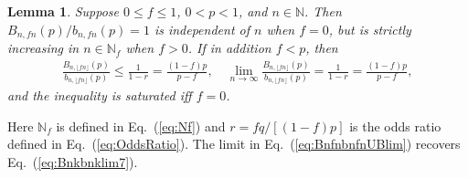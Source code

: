\documentclass[aop]{imsart}
\theoremstyle{plain}
\newtheorem{lemma}[theorem]{Lemma}
\theoremstyle{remark}
\newcommand{\bbN}{\mathbb{N}}
\newcommand{\1}{\operatorname{\uppercase\expandafter{\romannumeral1}}}
\newcommand{\2}{\operatorname{\uppercase\expandafter{\romannumeral2}}}
\newcommand{\3}{\operatorname{\uppercase\expandafter{\romannumeral3}}}
\newcommand{\4}{\operatorname{\uppercase\expandafter{\romannumeral4}}}
\newcommand{\5}{\operatorname{\uppercase\expandafter{\romannumeral5}}}
\newcommand{\6}{\operatorname{\uppercase\expandafter{\romannumeral6}}}
\newcommand{\7}{\operatorname{\uppercase\expandafter{\romannumeral7}}}
\newcommand{\8}{\operatorname{\uppercase\expandafter{\romannumeral8}}}
\newcommand{\9}{\operatorname{\uppercase\expandafter{\romannumeral9}}}
\newcommand{\eref}[1]{Eq.~\textup{(\ref{#1})}}
\begin{document}
\begin{lemma}\label{lem:Bnkpbnkpf}
	Suppose $0\leq  f\leq 1$, $0<p<1$, and  $n\in \bbN$. Then $B_{n,fn}(p)/b_{n,fn}(p)=1$ is independent of $n$ when $f=0$, but
 is strictly increasing in $n\in \bbN_f$ when $f>0$. If in addition  $f<p$, then
	\begin{align}
\frac{B_{n,\lfloor fn\rfloor}(p)}{b_{n,\lfloor fn\rfloor}(p)}\leq  \frac{1}{1-r}=\frac{(1-f)p}{p-f},\quad 	\lim_{n\to \infty} \frac{B_{n,\lfloor fn\rfloor}(p)}{b_{n,\lfloor fn\rfloor}(p)}=\frac{1}{1-r}=\frac{(1-f)p}{p-f}, \label{eq:BnfnbnfnUBlim}
	\end{align}	
 and the inequality is saturated iff $f=0$.
\end{lemma}
Here $\bbN_f$ is defined in \eref{eq:Nf} and  $r=fq/[(1-f)p]$ is the odds ratio defined in \eref{eq:OddsRatio}.
The limit in \eref{eq:BnfnbnfnUBlim} recovers \eref{eq:Bnkbnklim7}.
\end{document}
